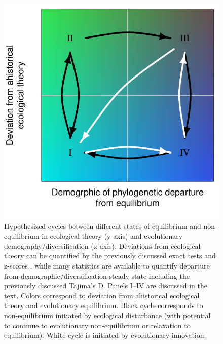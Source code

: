 \documentclass[12pt]{article}
\begin{document}
\begin{figure}[!hbp]
  \centering
  \includegraphics[scale=1]{fig_cycles.pdf}
  \caption{Hypothesized cycles between different states of equilibrium
    and non-equilibrium in ecological theory (y-axis) and evolutionary
    demography/diversification (x-axis). Deviations from ecological
    theory can be quantified by the previously discussed exact tests
    \citep{etienne2007} and z-scores \citep{meteR}, while many
    statistics are available to quantify departure from
    demographic/diversification steady state including the previously
    discussed Tajima's D. Panels I--IV are discussed in the text.
    Colors correspond to deviation from ahistorical ecological theory
    and evolutionary equilibrium.  Black cycle corresponds to
    non-equilibrium initiated by ecological disturbance (with
    potential to continue to evolutionary non-equilibrium or
    relaxation to equilibrium). White cycle is initiated by
    evolutionary innovation.}
  \label{fig:cycles}
\end{figure}
\end{document}
